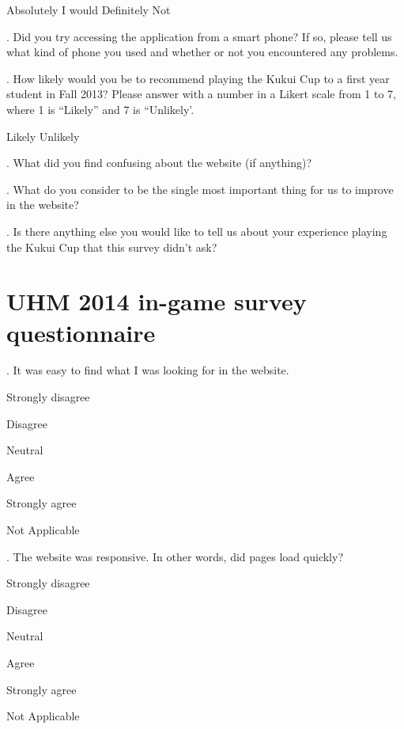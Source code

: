 \indent \indent Absolutely I would               \indent  Definitely Not

. Did you try accessing the application from a smart phone? If so, please tell us what kind of phone you used and whether or not you encountered any problems.

. How likely would you be to recommend playing the Kukui Cup to a first year student in Fall 2013?
Please answer with a number in a Likert scale from 1 to 7, where 1 is ``Likely'' and 7 is ``Unlikely'.

\indent \indent Likely               \indent  Unlikely

. What did you find confusing about the website (if anything)?

. What do you consider to be the single most important thing for us to improve in the website?

. Is there anything else you would like to tell us about your experience playing the Kukui Cup that
this survey didn't ask?

\section {UHM 2014 in-game survey questionnaire}

. It was easy to find what I was looking for in the website.
\begin{radiobutton}
	\item Strongly disagree
	\item Disagree
	\item Neutral
	\item Agree
	\item Strongly agree
	\item Not Applicable
\end{radiobutton}

. The website was responsive. In other words, did pages load quickly?
\begin{radiobutton}
	\item Strongly disagree
	\item Disagree
	\item Neutral
	\item Agree
	\item Strongly agree
	\item Not Applicable
\end{radiobutton}

